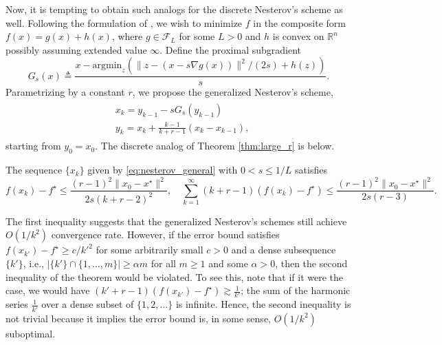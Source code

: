 \documentclass[twoside,11pt]{article}
\newcommand{\R}{\mathbb{R}}
\begin{document}
Now, it is tempting to obtain such analogs for the discrete Nesterov's scheme as well. Following the formulation of \cite{BeckTeboulle}, we wish to minimize $f$ in the composite form $f(x) = g(x) + h(x)$, where $g\in\mathcal{F}_L$ for some $L>0$ and $h$ is convex on $\R^n$ possibly assuming extended value $\infty$. Define the proximal subgradient
\begin{equation}\nonumber%
G_s(x) \triangleq \frac{x - \mbox{argmin}_{z}\left( \|z - (x-s\nabla g(x))\|^2/(2s) + h(z) \right) }{s}.
\end{equation}
Parametrizing by a constant $r$, we propose the generalized Nesterov's scheme,
\begin{gather}\label{eq:nesterov_general}
\begin{aligned}
&x_k = y_{k-1} -  sG_s(y_{k-1})\\
&y_k = x_k + \frac{k-1}{k+r-1}(x_k -x_{k-1}),
\end{aligned}
\end{gather}
starting from $y_0 = x_0$. The discrete analog of Theorem \ref{thm:large_r} is below.
\begin{theorem}\label{thm:large_r_dis}
The sequence $\{x_k\}$ given by \eqref{eq:nesterov_general} with $0 < s \le 1/L$ satisfies
\begin{equation}\nonumber
f(x_k) - f^\star \le \frac{(r-1)^2\|x_0 - x^\star\|^2}{2s(k+r-2)^2}, \quad \sum_{k=1}^{\infty}(k+r-1)(f(x_k)-f^\star) \le \frac{(r-1)^2\|x_0-x^\star\|^2}{2s(r-3)}.
\end{equation}
\end{theorem}
The first inequality suggests that the generalized Nesterov's schemes still achieve $O(1/k^2)$ convergence rate. However, if the error bound satisfies $f(x_{k'}) - f^\star \geq c/k'^2$ for some arbitrarily small $c > 0$ and a dense subsequence $\{k'\}$, i.e., $|\{k'\}\cap \{1, \ldots, m\}| \geq \alpha m$ for all $m \ge 1$ and some $\alpha > 0$, then the second inequality of the theorem would be violated. To see this, note that if it were the case, we would have $(k'+r-1)(f(x_{k'})-f^\star) \gtrsim \frac1{k'}$; the sum of the harmonic series $\frac1{k'}$ over a dense subset of $\{1, 2, \ldots\}$ is infinite. Hence, the second inequality is not trivial because it implies the error bound is, in some sense, $O(1/k^2)$ suboptimal. 
\end{document}
